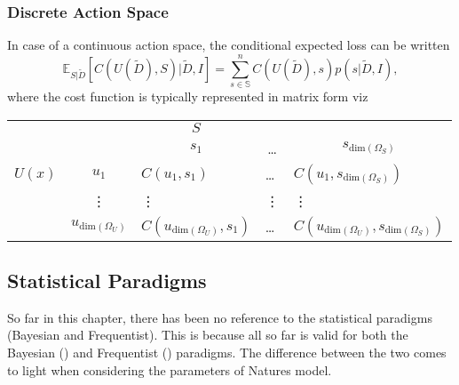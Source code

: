 \subsubsection{Discrete Action Space}
In case of a continuous action space, the conditional expected loss can be written
\begin{equation}
	\mathbb{E}_{S|\tilde{D}}[C(U(\tilde{D}), S)|\tilde{D},I] = \sum_{s\in \mathbb{S}}^nC(U(\tilde{D}),s)p(s|\tilde{D},I),
\end{equation}
where the cost function is typically represented in matrix form viz
\begin{center}
	\begin{tabular}{ c  c  c  c  c  }
		&& $S$& & \\
		&& $s_1$ & \dots & $s_{\text{dim}(\Omega_S)}$ \\
		\cline{3-5}
		$U(x)$ & $u_1$& \multicolumn{1}{|l}{$C(u_1, s_1)$} &\multicolumn{1}{l}{\dots}&\multicolumn{1}{l|}{$C(u_1, s_{\text{dim}(\Omega_S)})$} \\
		& \vdots & \multicolumn{1}{|l}{\vdots} &\multicolumn{1}{l}{\vdots}&\multicolumn{1}{l|}{\vdots} \\
		& $u_{\text{dim}(\Omega_U)}$ & \multicolumn{1}{|l}{$C(u_{\text{dim}(\Omega_U)}, s_1)$} &\multicolumn{1}{l}{\dots}&\multicolumn{1}{l|}{$C(u_{\text{dim}(\Omega_U)}, s_{\text{dim}(\Omega_S)})$} \\
		\cline{3-5}
	\end{tabular}
\end{center}

\subsection{Statistical Paradigms}
So far in this chapter, there has been no reference to the statistical paradigms (Bayesian and Frequentist). This is because all so far is valid for both the Bayesian () and Frequentist () paradigms. The difference between the two comes to light when considering the parameters of Natures model.  